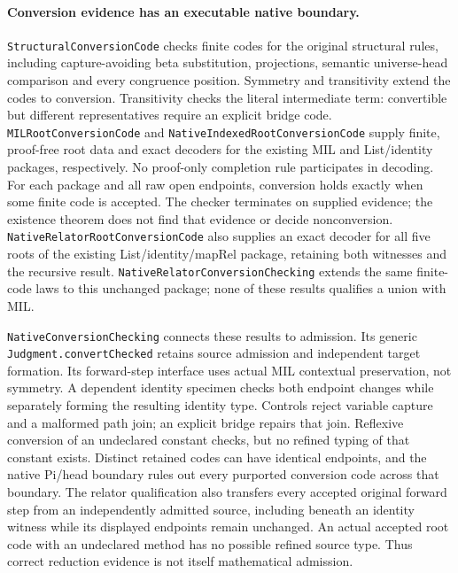 \documentclass[11pt]{article}
\theoremstyle{definition}
\theoremstyle{remark}
\begin{document}
\paragraph{Conversion evidence has an executable native boundary.}
\nolinkurl{StructuralConversionCode} checks finite codes for the original
structural rules, including capture-avoiding beta substitution, projections,
semantic universe-head comparison and every congruence position. Symmetry
and transitivity extend the codes to conversion. Transitivity checks the
literal intermediate term: convertible but different representatives require
an explicit bridge code. \nolinkurl{MILRootConversionCode} and
\nolinkurl{NativeIndexedRootConversionCode} supply finite, proof-free root
data and exact decoders for the existing MIL and List/identity packages,
respectively. No proof-only completion rule participates in decoding.
For each package and all raw open endpoints, conversion holds exactly when
some finite code is accepted. The checker terminates on supplied evidence;
the existence theorem does not find that evidence or decide nonconversion.
\nolinkurl{NativeRelatorRootConversionCode} also supplies an exact decoder
for all five roots of the existing List/identity/mapRel package, retaining
both witnesses and the recursive result. \nolinkurl{NativeRelatorConversionChecking}
extends the same finite-code laws to this unchanged package; none of these
results qualifies a union with MIL.

\nolinkurl{NativeConversionChecking} connects these results to admission.
Its generic \nolinkurl{Judgment.convertChecked} retains source admission
and independent target formation. Its forward-step interface uses actual
MIL contextual preservation, not symmetry. A dependent identity specimen
checks both endpoint changes while separately forming the resulting identity
type. Controls reject variable capture and a malformed path join; an explicit
bridge repairs that join. Reflexive conversion of an undeclared constant
checks, but no refined typing of that constant exists. Distinct retained
codes can have identical endpoints, and the native Pi/head boundary rules
out every purported conversion code across that boundary.
The relator qualification also transfers every accepted original forward
step from an independently admitted source, including beneath an identity
witness while its displayed endpoints remain unchanged. An actual accepted
root code with an undeclared method has no possible refined source type.
Thus correct reduction evidence is not itself mathematical admission.
\end{document}
